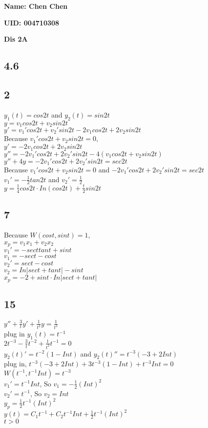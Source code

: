 \documentclass[12pt, a4paper]{IEEEtran}
\begin{document}
    \centerline{\textbf{Name: Chen Chen}}
    \centerline{\textbf{UID: 004710308}}
    \centerline{\textbf{Dis 2A}}
    \begin{flushleft}
    
    
    \section*{4.6}
    \subsection*{2}
    $y_1(t)=cos2t$ and $y_2(t)=sin2t$\\
    $y=v_1cos2t+v_2sin2t$\\
    $y'=v_1'cos2t+v_2'sin2t-2v_1cos2t+2v_2sin2t$\\
    Because $v_1'cos2t+v_2sin2t=0$,\\
    $y'=-2v_1cos2t+2v_2sin2t$\\
    $y''=-2v_1'cos2t+2v_2'sin2t-4(v_1cos2t+v_2sin2t)$\\
    $y''+4y=-2v_1'cos2t+2v_2'sin2t=sec2t$\\
    Because $v_1'cos2t+v_2sin2t=0$ and $-2v_1'cos2t+2v_2'sin2t=sec2t$\\
    $v_1'=-\frac{1}{2}tan2t$ and $v_2'=\frac{1}{2}$\\
    $y=\frac{1}{4}cos2t\cdot In(cos2t)+\frac{t}{2}sin2t$\\
    
    \subsection*{7}
    Because $W(cost, sint)=1$,\\
    $x_p=v_1x_1+v_2x_2$\\
    $v_1'=-secttant+sint$\\
    $v_1=-sect-cost$\\
    $v_2'=sect-cost$\\
    $v_2=In|sect+tant|-sint$\\
    $x_p=-2+sint\cdot In|sect+tant|$\\
    
    \subsection*{15}
    $y''+\frac{3}{t}y'+\frac{1}{t^2}y=\frac{1}{t^3}$\\
    plug in $y_1(t)=t^{-1}$\\
    $2t^{-3}-\frac{3}{t}t^{-2}+\frac{1}{t^2}t^{-1}=0$\\
    $y_2(t)'=t^{-2}(1-Int)$ and $y_2(t)''=t^{-3}(-3+2Int)$\\
    plug in, $t^{-3}(-3+2Int)+3t^{-3}(1-Int)+t^{-3}Int=0$\\
    $W(t^{-1}, t^{-1}Int)=t^{-3}$\\
    $v_1'=t^{-1}Int$, So $v_1=-\frac{1}{2}(Int)^2$\\
    $v_2'=t^{-1}$, So $v_2=Int$\\
    $y_p=\frac{1}{2}t^{-1}(Int)^2$\\
    $y(t)=C_1t^{-1}+C_2t^{-1}Int+\frac{1}{2}t^{-1}(Int)^2$\\
    $t>0$\\
    


\end{flushleft}
\end{document}
